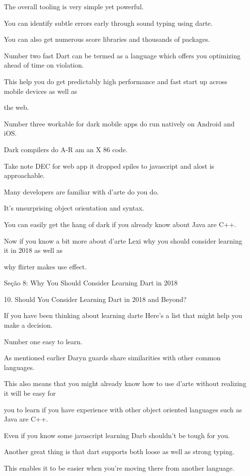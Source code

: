 The overall tooling is very simple yet powerful.

You can identify subtle errors early through sound typing using darte.

You can also get numerous score libraries and thousands of packages.

Number two fast Dart can be termed as a language which offers you optimizing ahead of time on violation.

This help you do get predictably high performance and fast start up across mobile devices as well as

the web.

Number three workable for dark mobile apps do run natively on Android and iOS.

Dark compilers do A-R am an X 86 code.

Take note DEC for web app it dropped spiles to javascript and alost is approachable.

Many developers are familiar with d'arte do you do.

It's unsurprising object orientation and syntax.

You can easily get the hang of dark if you already know about Java are C++.

Now if you know a bit more about d'arte Lexi why you should consider learning it in 2018 as well as

why flirter makes use effect.

Seção 8: Why You Should Consider Learning Dart in
2018

10. Should You Consider Learning Dart in 2018 and
Beyond?

If you have been thinking about learning darte Here's a list that might help you make a decision.

Number one easy to learn.

As mentioned earlier Daryn guards share similarities with other common languages.

This also means that you might already know how to use d'arte without realizing it will be easy for

you to learn if you have experience with other object oriented languages such as Java are C++.

Even if you know some javascript learning Darb shouldn't be tough for you.

Another great thing is that dart supports both loose as well as strong typing.

This enables it to be easier when you're moving there from another language.

